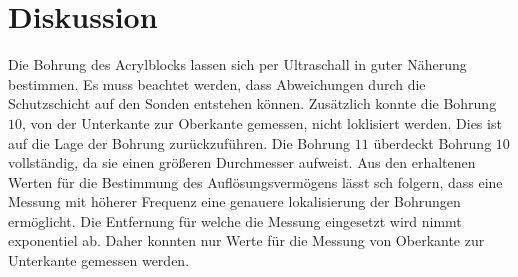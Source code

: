 \section{Diskussion}
\label{sec:Diskussion}
Die Bohrung des Acrylblocks lassen sich per Ultraschall in guter Näherung bestimmen.
Es muss beachtet werden, dass Abweichungen durch die Schutzschicht auf den Sonden entstehen können.
Zusätzlich konnte die Bohrung $10$, von der Unterkante zur Oberkante gemessen, nicht loklisiert werden.
Dies ist auf die Lage der Bohrung zurückzuführen.
Die Bohrung $11$ überdeckt Bohrung $10$ vollständig, da sie einen größeren Durchmesser aufweist. 
Aus den erhaltenen Werten für die Bestimmung des Auflösungsvermögens lässt sch folgern, dass eine Messung mit höherer Frequenz eine genauere lokalisierung der Bohrungen ermöglicht.
Die Entfernung für welche die Messung eingesetzt wird nimmt exponentiel ab.
Daher konnten nur Werte für die Messung von Oberkante zur Unterkante gemessen werden.
